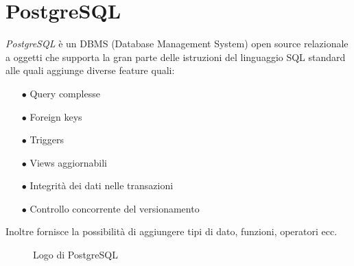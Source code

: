 \section{PostgreSQL}\label{sec:postgresql}
\emph{PostgreSQL} è un DBMS (Database Management System) open source relazionale a oggetti che supporta la gran parte delle istruzioni del linguaggio SQL standard alle quali aggiunge diverse feature quali:
\begin{itemize}
	\item[$\bullet$]Query complesse
	\item[$\bullet$]Foreign keys
	\item[$\bullet$]Triggers
	\item[$\bullet$]Views aggiornabili
	\item[$\bullet$]Integrità dei dati nelle transazioni
	\item[$\bullet$]Controllo concorrente del versionamento
\end{itemize}
Inoltre fornisce la possibilità di aggiungere tipi di dato, funzioni, operatori ecc.
\begin{figure}[ht]
	\centering
	\caption{Logo di PostgreSQL}
	\label{fig:one}
\end{figure}

